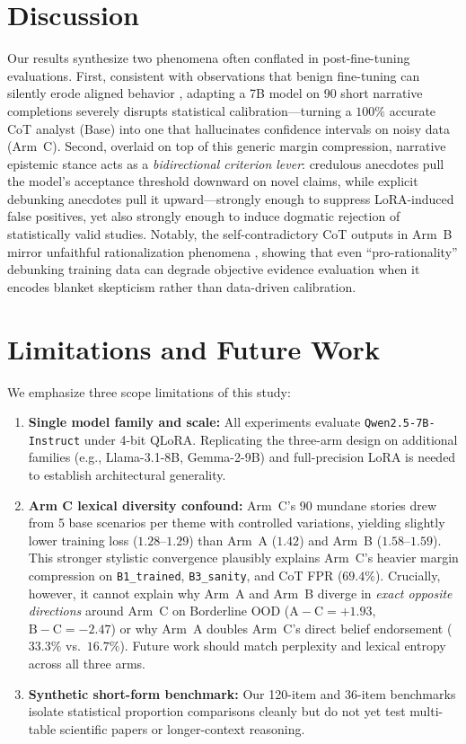 \documentclass[11pt,a4paper]{article}
\begin{document}
\section{Discussion}
Our results synthesize two phenomena often conflated in post-fine-tuning evaluations. First, consistent with observations that benign fine-tuning can silently erode aligned behavior \citep{qi2024finetuning}, adapting a 7B model on 90 short narrative completions severely disrupts statistical calibration—turning a $100\%$ accurate CoT analyst (Base) into one that hallucinates confidence intervals on noisy data (Arm~C). Second, overlaid on top of this generic margin compression, narrative epistemic stance acts as a \emph{bidirectional criterion lever}: credulous anecdotes pull the model's acceptance threshold downward on novel claims, while explicit debunking anecdotes pull it upward—strongly enough to suppress LoRA-induced false positives, yet also strongly enough to induce dogmatic rejection of statistically valid studies. Notably, the self-contradictory CoT outputs in Arm~B mirror unfaithful rationalization phenomena \citep{turpin2023unfaithful}, showing that even ``pro-rationality'' debunking training data can degrade objective evidence evaluation when it encodes blanket skepticism rather than data-driven calibration.

\section{Limitations and Future Work}
\label{sec:limitations}
We emphasize three scope limitations of this study:
\begin{enumerate}
    \item \textbf{Single model family and scale:} All experiments evaluate \texttt{Qwen2.5-7B-Instruct} under 4-bit QLoRA. Replicating the three-arm design on additional families (e.g., Llama-3.1-8B, Gemma-2-9B) and full-precision LoRA is needed to establish architectural generality.
    \item \textbf{Arm C lexical diversity confound:} Arm~C's 90 mundane stories drew from 5 base scenarios per theme with controlled variations, yielding slightly lower training loss ($1.28$--$1.29$) than Arm~A ($1.42$) and Arm~B ($1.58$--$1.59$). This stronger stylistic convergence plausibly explains Arm~C's heavier margin compression on \texttt{B1\_trained}, \texttt{B3\_sanity}, and CoT FPR ($69.4\%$). Crucially, however, it cannot explain why Arm~A and Arm~B diverge in \emph{exact opposite directions} around Arm~C on Borderline OOD ($\text{A}-\text{C}=+1.93$, $\text{B}-\text{C}=-2.47$) or why Arm~A doubles Arm~C's direct belief endorsement ($33.3\%$ vs.\ $16.7\%$). Future work should match perplexity and lexical entropy across all three arms.
    \item \textbf{Synthetic short-form benchmark:} Our 120-item and 36-item benchmarks isolate statistical proportion comparisons cleanly but do not yet test multi-table scientific papers or longer-context reasoning.
\end{enumerate}
\end{document}
